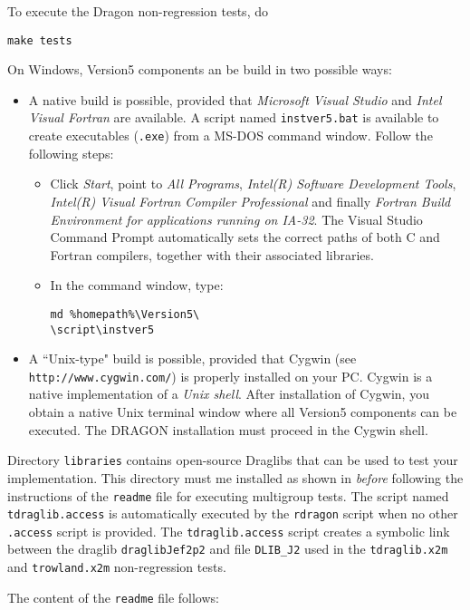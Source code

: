 \noindent To execute the Dragon non-regression tests, do
\begin{verbatim}
make tests
\end{verbatim}

\vskip 0.08cm

On Windows, Version5 components an be build in two possible ways:
\begin{itemize}
\item  A native build is possible, provided that {\sl Microsoft Visual Studio} and {\sl Intel Visual Fortran} are available.
A script named {\tt instver5.bat} is available to create executables ({\tt .exe}) from a MS-DOS command
window. Follow the following steps:
\begin{itemize}
\item Click {\sl Start}, point to {\sl All Programs}, {\sl Intel(R) Software Development Tools}, {\sl Intel(R) Visual Fortran
Compiler Professional} and finally {\sl Fortran Build Environment for applications running on IA-32}. The Visual Studio Command Prompt
automatically sets the correct paths of both C and Fortran compilers, together with their associated libraries.
\item In the command window, type: \\
\noindent \begin{verbatim}
md %homepath%\Version5\
\script\instver5
\end{verbatim}
\end{itemize}
\item  A ``Unix-type" build is possible, provided that Cygwin (see {\tt http://www.cygwin.com/}) is properly installed on your PC. Cygwin is a
native implementation of a {\sl Unix shell}. After installation of
Cygwin, you obtain a native Unix
terminal window where all Version5 components can be executed. The DRAGON installation must proceed
in the Cygwin shell.
\end{itemize}

\vskip 0.08cm

Directory {\tt libraries} contains open-source Draglibs that can be used to
test your implementation. This directory must me installed as shown in 
{\sl before} following the instructions of the {\tt readme} file for executing
multigroup tests. The script named
{\tt tdraglib.access} is automatically executed by the {\tt rdragon} script when
no other {\tt *.access} script is provided. The {\tt tdraglib.access} script creates
a symbolic link between the draglib {\tt draglibJef2p2} and file {\tt DLIB\_J2}
used in the {\tt tdraglib.x2m} and {\tt trowland.x2m} non-regression tests.

\vskip 0.08cm

The content of the {\tt readme} file follows:

